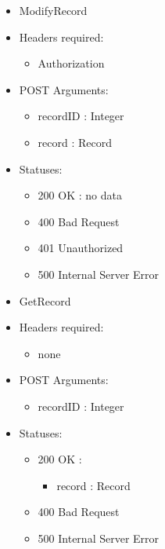 \begin{itemize}
        \item ModifyRecord
        \item Headers required:
        \begin{itemize}
        	\item Authorization
        \end{itemize}
        \item POST Arguments:
        \begin{itemize}
        	\item recordID : Integer
        	\item record : Record
        \end{itemize}
        \item Statuses:
        \begin{itemize}
        	\item 200 OK : no data
        	\item 400 Bad Request
        	\item 401 Unauthorized
        	\item 500 Internal Server Error
        \end{itemize}


        \item GetRecord
        \item Headers required: 
        \begin{itemize}
            \item none
        \end{itemize}
        \item POST Arguments:
        \begin{itemize}
        	\item recordID : Integer
        \end{itemize}
        \item Statuses:
        \begin{itemize}
        	\item 200 OK :
            \begin{itemize}
                \item record : Record
            \end{itemize}
        	\item 400 Bad Request
        	\item 500 Internal Server Error
        \end{itemize}


\end{itemize}
